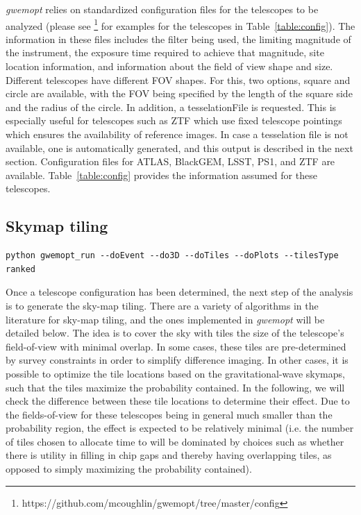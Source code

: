 \documentclass[twocolumn]{aastex62}
\begin{document}
\emph{gwemopt} relies on standardized configuration files for the telescopes to be analyzed (please see \footnote{https://github.com/mcoughlin/gwemopt/tree/master/config} for examples for the telescopes in Table~\ref{table:config}). 
The information in these files includes the filter being used, the limiting magnitude of the instrument, the exposure time required to achieve that magnitude, site location information, and information about the field of view shape and size. 
Different telescopes have different FOV shapes.
For this, two options, square and circle are available, with the FOV being specified by the length of the square side and the radius of the circle. In addition, a tesselationFile is requested. This is especially useful for telescopes such as ZTF which use fixed telescope pointings which ensures the availability of reference images. In case a tesselation file is not available, one is automatically generated, and this output is described in the next section.
Configuration files for ATLAS, BlackGEM, LSST, PS1, and ZTF are available.
Table~\ref{table:config} provides the information assumed for these telescopes.\\

\subsection{Skymap tiling}
\label{subsection:tiling}
\begin{lstlisting}
python gwemopt_run --doEvent --do3D --doTiles --doPlots --tilesType ranked
\end{lstlisting}
Once a telescope configuration has been determined, the next step of the analysis is to generate the sky-map tiling.
There are a variety of algorithms in the literature for sky-map tiling, and the ones implemented in \emph{gwemopt} will be detailed below. The idea is to cover the sky with tiles the size of the telescope's field-of-view with minimal overlap. In some cases, these tiles are pre-determined by survey constraints in order to simplify difference imaging. In other cases, it is possible to optimize the tile locations based on the gravitational-wave skymaps, such that the tiles maximize the probability contained. In the following, we will check the difference between these tile locations to determine their effect. Due to the fields-of-view for these telescopes being in general much smaller than the probability region, the effect is expected to be relatively minimal (i.e. the number of tiles chosen to allocate time to will be dominated by choices such as whether there is utility in filling in chip gaps and thereby having overlapping tiles, as opposed to simply maximizing the probability contained).
\end{document}
